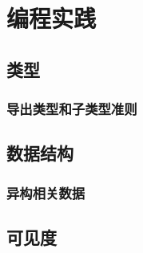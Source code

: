 %
%
%

\chapter{编程实践}

\section{类型}
\subsection{导出类型和子类型准则} %
\label{c:prog-prac:types:derived}

\section{数据结构}

\subsection{异构相关数据}
\label{c:prog-prac:data:heterogeneous}

\section{可见度}
\label{c:prog-prac:data:visibility}

